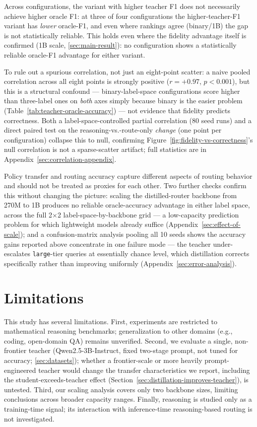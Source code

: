 \documentclass{article}
\begin{document}
Across configurations, the variant with higher teacher F1 does not
necessarily achieve higher oracle F1: at three of four configurations
the higher-teacher-F1 variant has \emph{lower} oracle-F1, and even
where rankings agree (binary/1B) the gap is not statistically
reliable. This holds even where the fidelity advantage itself is
confirmed (1B scale, \ref{sec:main-result}): no configuration shows a
statistically reliable oracle-F1 advantage for either variant.

To rule out a spurious correlation, not just an eight-point scatter: a
naive pooled correlation across all eight points is strongly positive
($r = +0.97$, $p < 0.001$), but this is a structural confound —
binary-label-space configurations score higher than three-label ones
on \emph{both} axes simply because binary is the easier problem
(Table~\ref{tab:teacher-oracle-accuracy}) — not evidence that fidelity
predicts correctness. Both a label-space-controlled partial
correlation (80 seed runs) and a direct paired test on the
reasoning-vs.-route-only \emph{change} (one point per configuration)
collapse this to null, confirming Figure~\ref{fig:fidelity-vs-correctness}'s
null correlation is not a sparse-scatter artifact; full statistics are
in Appendix~\ref{sec:correlation-appendix}.

Policy transfer and routing accuracy capture different aspects of
routing behavior and should not be treated as proxies for each other.
Two further checks confirm this without changing the picture: scaling
the distilled-router backbone from 270M to 1B produces no reliable
oracle-accuracy advantage in either label space, across the full
2$\times$2 label-space-by-backbone grid — a low-capacity prediction
problem for which lightweight models already suffice
(Appendix~\ref{sec:effect-of-scale}); and a confusion-matrix analysis
pooling all 10 seeds shows the accuracy gains reported above
concentrate in one failure mode — the teacher under-escalates
\texttt{large}-tier queries at essentially chance level, which
distillation corrects specifically rather than improving uniformly
(Appendix~\ref{sec:error-analysis}).

\section{Limitations}
\label{sec:limitations}

This study has several limitations. First, experiments are restricted to mathematical reasoning benchmarks; generalization to other domains (e.g., coding, open-domain QA) remains unverified. Second, we evaluate a single, non-frontier teacher (Qwen2.5-3B-Instruct, fixed two-stage prompt, not tuned for accuracy; \ref{sec:datasets}); whether a frontier-scale or more heavily prompt-engineered teacher would change the transfer characteristics we report, including the student-exceeds-teacher effect (Section~\ref{sec:distillation-improves-teacher}), is untested. Third, our scaling analysis covers only two backbone sizes, limiting conclusions across broader capacity ranges. Finally, reasoning is studied only as a training-time signal; its interaction with inference-time reasoning-based routing is not investigated.
\end{document}
